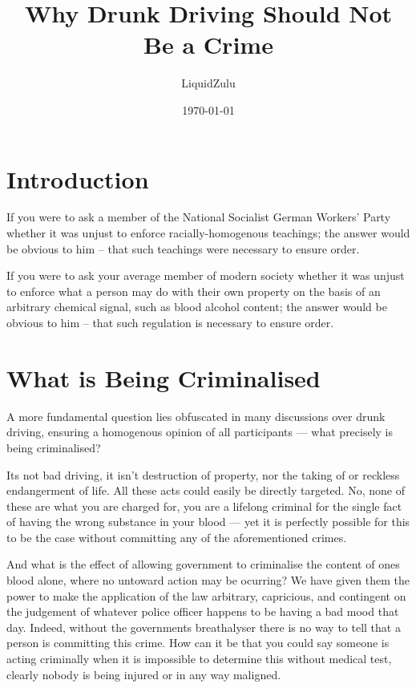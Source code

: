 \documentclass[11pt]{article}
\author{LiquidZulu}
\date{\today}
\title{Why Drunk Driving Should Not Be a Crime}
\begin{document}
\maketitle
\tableofcontents

\newpage
\section{Introduction}
\label{sec:orga5f8157}
If you were to ask a member of the National Socialist German Workers' Party whether it was unjust to enforce racially-homogenous teachings; the answer would be obvious to him -- that such teachings were necessary to ensure order.

If you were to ask your average member of modern society whether it was unjust to enforce what a person may do with their own property on the basis of an arbitrary chemical signal, such as blood alcohol content; the answer would be obvious to him -- that such regulation is necessary to ensure order.


\section{What is Being Criminalised}
\label{sec:orga86f7fa}

A more fundamental question lies obfuscated in many discussions over drunk driving, ensuring a homogenous opinion of all participants --- what precisely is being criminalised?

Its not bad driving, it isn't destruction of property, nor the taking of or reckless endangerment of life. All these acts could easily be directly targeted. No, none of these are what you are charged for, you are a lifelong criminal for the single fact of having the wrong substance in your blood --- yet it is perfectly possible for this to be the case without committing any of the aforementioned crimes.

And what is the effect of allowing government to criminalise the content of ones blood alone, where no untoward action may be ocurring? We have given them the power to make the application of the law arbitrary, capricious, and contingent on the judgement of whatever police officer happens to be having a bad mood that day. Indeed, without the governments breathalyser there is no way to tell that a person is committing this crime. How can it be that you could say someone is acting criminally when it is impossible to determine this without medical test, clearly nobody is being injured or in any way maligned.
\end{document}
